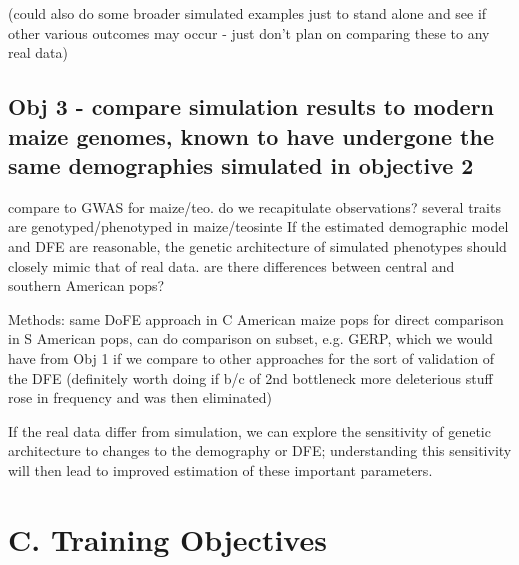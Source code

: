 	(could also do some broader simulated examples just to stand alone and see if other various outcomes may occur - just don't plan on comparing these to any real data)

\subsection{Obj 3 - compare simulation results to modern maize genomes, known to have undergone the same demographies simulated in objective 2}%
	compare to GWAS for maize/teo. do we recapitulate observations?
		several traits are genotyped/phenotyped in maize/teosinte
		If the estimated demographic model and DFE are reasonable, the genetic architecture of simulated phenotypes should closely mimic that of real data.
	are there differences between central and southern American pops? 
	
	Methods: same DoFE approach in C American maize pops for direct comparison
		in S American pops, can do comparison on subset, e.g. GERP, which we would have from Obj 1 if we compare to other approaches for the sort of validation of the DFE
			(definitely worth doing if b/c of 2nd bottleneck more deleterious stuff rose in frequency and was then eliminated)

	If the real data differ from simulation, we can explore the sensitivity of genetic architecture to changes to the demography or DFE; understanding this sensitivity will then lead to improved estimation of these important parameters.

	
	
	
	
	
	
	
	
	
	
	
	
	
	
	
\section*{C. Training Objectives}

